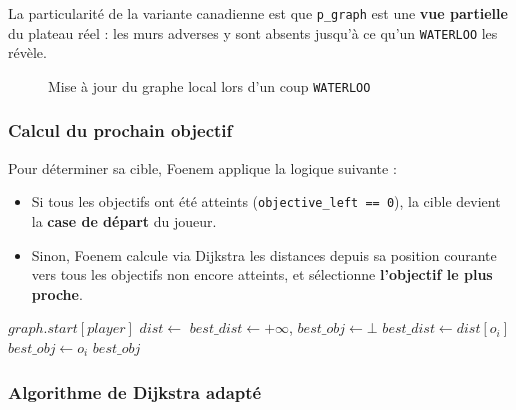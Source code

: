 \documentclass[12pt,a4paper]{article}
\begin{document}
\noindent La particularité de la variante canadienne est que \texttt{p\_graph} 
est une \textbf{vue partielle} du plateau réel : les murs adverses y sont 
absents jusqu'à ce qu'un \texttt{WATERLOO} les révèle.



\begin{figure}[h]
\centering
\caption{Mise à jour du graphe local lors d'un coup \texttt{WATERLOO}}
\end{figure}

\subsubsection{Calcul du prochain objectif}

Pour déterminer sa cible, Foenem applique la logique suivante :

\begin{itemize}
    \item Si tous les objectifs ont été atteints (\texttt{objective\_left == 0}), 
    la cible devient la \textbf{case de départ} du joueur.
    \item Sinon, Foenem calcule via Dijkstra les distances depuis sa position 
    courante vers tous les objectifs non encore atteints, et sélectionne 
    \textbf{l'objectif le plus proche}.
\end{itemize}

\begin{algorithm}
\caption{Selection of the next objective}
\begin{algorithmic}[1]
        \State \Return $graph.start[player]$
    \EndIf
    \State $dist \gets$ 
    \State $best\_dist \gets +\infty$, $best\_obj \gets \bot$
            \State $best\_dist \gets dist[o_i]$
            \State $best\_obj \gets o_i$
        \EndIf
    \EndFor
    \State \Return $best\_obj$
\EndFunction
\end{algorithmic}
\end{algorithm}

\subsubsection{Algorithme de Dijkstra adapté}
\end{document}
